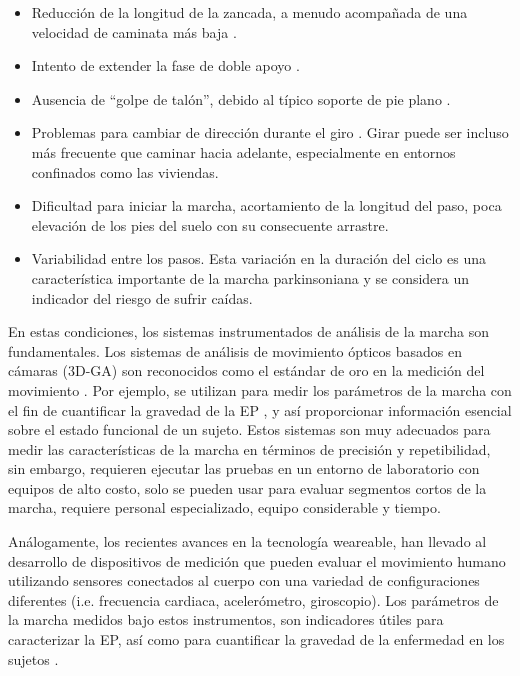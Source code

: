 \begin{itemize}
    \item Reducción de la longitud de la zancada, a menudo acompañada de una velocidad de caminata más baja \cite{DeSouza2011}.
    \item Intento de extender la fase de doble apoyo \cite{Sofuwa2015}.
    \item Ausencia de ``golpe de talón'', debido al típico soporte de pie plano \cite{Sofuwa2015}.
    \item Problemas para cambiar de dirección durante el giro \cite{MORRIS2001459,Nutt2011}. Girar puede ser incluso más frecuente que caminar hacia adelante, especialmente en entornos confinados como las viviendas.
    \item Dificultad para iniciar la marcha, acortamiento de la longitud del paso, poca elevación de los pies del suelo con su consecuente arrastre.
    \item Variabilidad entre los pasos. Esta variación en la duración del ciclo es una característica importante de la marcha parkinsoniana y se considera un indicador del riesgo de sufrir caídas.
\end{itemize}

En estas condiciones, los sistemas instrumentados de análisis de la marcha son fundamentales. Los sistemas de análisis de movimiento ópticos basados en cámaras (3D-GA) son reconocidos como el estándar de oro en la medición del movimiento \cite{Stamatakis}. Por ejemplo, se utilizan para medir los parámetros de la marcha con el fin de cuantificar la gravedad de la EP \cite{ROIZ2010}, y así proporcionar información esencial sobre el estado funcional de un sujeto. Estos sistemas son muy adecuados para medir las características de la marcha en términos de precisión y repetibilidad, sin embargo, requieren ejecutar las pruebas en un entorno de laboratorio con equipos de alto costo, solo se pueden usar para evaluar segmentos cortos de la marcha, requiere personal especializado, equipo considerable y tiempo.\label{parkinson:limitaciones}

Análogamente, los recientes avances en la tecnología weareable, han llevado al desarrollo de dispositivos de medición que pueden evaluar el movimiento humano utilizando sensores conectados al cuerpo con una variedad de configuraciones diferentes (i.e. frecuencia cardiaca, acelerómetro, giroscopio). Los parámetros de la marcha medidos bajo estos instrumentos, son indicadores útiles para caracterizar la EP, así como para cuantificar la gravedad de la enfermedad en los sujetos \cite{Dewey2014}. 

